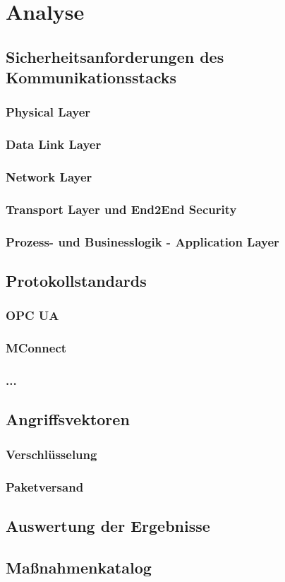 \chapter{Analyse}

\section{Sicherheitsanforderungen des Kommunikationsstacks}

\subsection{Physical Layer}
\subsection{Data Link Layer}
\subsection{Network Layer}
\subsection{Transport Layer und End2End Security}
\subsection{Prozess- und Businesslogik - Application Layer}

\section{Protokollstandards}

\subsection{OPC UA}
\subsection{MConnect}
\subsection{...}

\section{Angriffsvektoren}

\subsection{Verschlüsselung}
\subsection{Paketversand}
\subsection{}

\section{Auswertung der Ergebnisse}

\section{Maßnahmenkatalog}